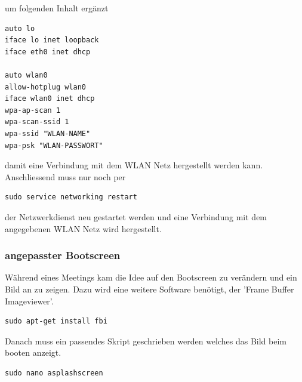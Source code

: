 \documentclass[11pt,a4paper]{article} %
\begin{document}
um folgenden Inhalt ergänzt
\begin{frame}

\begin{lstlisting}
auto lo
iface lo inet loopback
iface eth0 inet dhcp

auto wlan0
allow-hotplug wlan0
iface wlan0 inet dhcp
wpa-ap-scan 1
wpa-scan-ssid 1
wpa-ssid "WLAN-NAME"
wpa-psk "WLAN-PASSWORT"

\end{lstlisting}

\end{frame}

damit eine Verbindung mit dem WLAN Netz hergestellt werden kann.
Anschliessend muss nur noch per
\begin{frame}

\begin{lstlisting}
sudo service networking restart
\end{lstlisting}

\end{frame}
der Netzwerkdienst neu gestartet werden und eine Verbindung mit dem angegebenen WLAN Netz wird hergestellt.

\subsubsection{angepasster Bootscreen}
Während eines Meetings kam die Idee auf den Bootscreen zu verändern und ein Bild an zu zeigen. Dazu wird eine weitere Software benötigt, der 'Frame Buffer Imageviewer'.
\begin{frame}

\begin{lstlisting}
sudo apt-get install fbi
\end{lstlisting}

\end{frame}

Danach muss ein passendes Skript geschrieben werden welches das Bild beim booten anzeigt.
\begin{frame}

\begin{lstlisting}
sudo nano asplashscreen
\end{lstlisting}

\end{frame}
\end{document}
